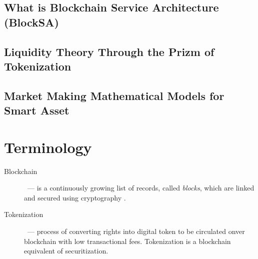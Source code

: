 \documentclass{article}
\begin{document}
\begin{multicols}{2}
\subsection{What is Blockchain Serviсe Architecture (BlockSA)}

\subsection{Liquidity Theory Through the Prizm of Tokenization}

\subsection{Market Making Mathematical Models for Smart Asset}



\end{multicols}

\newpage
\appendix

\section{Terminology}
\begin{description}
\item[Blockchain]~--- is a continuously growing list of records, called \textit{blocks}, which are linked and secured using cryptography \cite{bitcoinComprehensive2016} \cite{wikipediaBlockchain}.
\item[Tokenization]~--- process of converting rights into digital token to be circulated onver blockchain with low transactional fees. Tokenization is a blockchain equivalent of securitization.
\end{description}

\printbibliography
\end{document}
